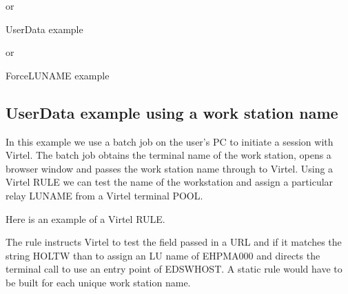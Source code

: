 \documentclass[letterpaper,10pt,english]{sphinxmanual}
\begin{document}
\sphinxAtStartPar
or

\sphinxAtStartPar
{}            UserData example

\sphinxAtStartPar
or

\sphinxAtStartPar
{}          ForceLUNAME example

\ignorespaces 

\subsection{UserData example using a work station name}
\label{\detokenize{connectivity_guide:userdata-example-using-a-work-station-name}}\label{\detokenize{connectivity_guide:index-150}}
\sphinxAtStartPar
In this example we use a batch job on the user’s PC to initiate a session with Virtel. The batch job obtains the terminal name of the work station, opens a browser window and passes the work station name through to Virtel. Using a Virtel RULE we can test the name of the workstation and assign a particular relay LUNAME from a Virtel terminal POOL.

\sphinxAtStartPar
Here is an example of a Virtel RULE.

\begin{sphinxVerbatim}[commandchars=\\\{\}]
 
\end{sphinxVerbatim}

\sphinxAtStartPar
The rule instructs Virtel to test the  field passed in a URL and if it matches the string HOLT\sphinxhyphen{}W than to assign an LU name of EHPMA000 and directs the terminal call to use an entry point of EDSWHOST. A static rule would have to be built for each unique work station name.
\end{document}
